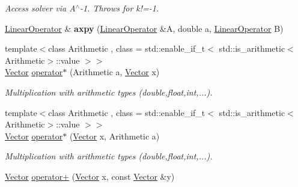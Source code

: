 \begin{DoxyCompactItemize}
\begin{DoxyCompactList}\small\item\em \-Access solver via \-A$^\wedge$-\/1. \-Throws for k!=-\/1. \end{DoxyCompactList}\item 
\hypertarget{namespaceSpacy_ad08055ec05275c6042d516d4726b5e8f}{\hyperlink{classSpacy_1_1LinearOperator}{\-Linear\-Operator} \& {\bfseries axpy} (\hyperlink{classSpacy_1_1LinearOperator}{\-Linear\-Operator} \&\-A, double a, \hyperlink{classSpacy_1_1LinearOperator}{\-Linear\-Operator} \-B)}\label{namespaceSpacy_ad08055ec05275c6042d516d4726b5e8f}

\item 
\hypertarget{namespaceSpacy_ae0a1cbb3d98d6ac0a82727959038f4b4}{{\footnotesize template$<$class Arithmetic , class  = std\-::enable\-\_\-if\-\_\-t$<$ std\-::is\-\_\-arithmetic$<$\-Arithmetic$>$\-::value $>$$>$ }\\\hyperlink{classSpacy_1_1Vector}{\-Vector} \hyperlink{namespaceSpacy_ae0a1cbb3d98d6ac0a82727959038f4b4}{operator$\ast$} (\-Arithmetic a, \hyperlink{classSpacy_1_1Vector}{\-Vector} x)}\label{namespaceSpacy_ae0a1cbb3d98d6ac0a82727959038f4b4}

\begin{DoxyCompactList}\small\item\em \-Multiplication with arithmetic types (double,float,int,...). \end{DoxyCompactList}\item 
\hypertarget{namespaceSpacy_a0120fd6b1d7580a9f7b8f24e646cbc6c}{{\footnotesize template$<$class Arithmetic , class  = std\-::enable\-\_\-if\-\_\-t$<$ std\-::is\-\_\-arithmetic$<$\-Arithmetic$>$\-::value $>$$>$ }\\\hyperlink{classSpacy_1_1Vector}{\-Vector} \hyperlink{namespaceSpacy_a0120fd6b1d7580a9f7b8f24e646cbc6c}{operator$\ast$} (\hyperlink{classSpacy_1_1Vector}{\-Vector} x, \-Arithmetic a)}\label{namespaceSpacy_a0120fd6b1d7580a9f7b8f24e646cbc6c}

\begin{DoxyCompactList}\small\item\em \-Multiplication with arithmetic types (double,float,int,...). \end{DoxyCompactList}\item 
\hypertarget{namespaceSpacy_a19486acb05af1627ec49c376b204a61c}{\hyperlink{classSpacy_1_1Vector}{\-Vector} \hyperlink{namespaceSpacy_a19486acb05af1627ec49c376b204a61c}{operator+} (\hyperlink{classSpacy_1_1Vector}{\-Vector} x, const \hyperlink{classSpacy_1_1Vector}{\-Vector} \&y)}\label{namespaceSpacy_a19486acb05af1627ec49c376b204a61c}


\end{DoxyCompactItemize}
